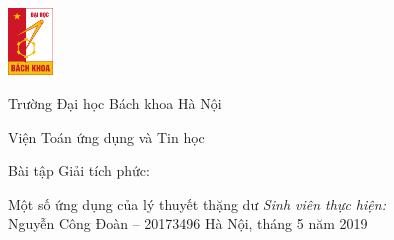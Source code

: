 \documentclass[14pt]{article}
\begin{document}
\begin{titlepage}
	\parbox{4.2em}{
		\includegraphics[width=3.2em]{resources/bk.jpg}
	}
	\parbox{\textwidth-4.6em}{
		{\LARGE Trường Đại học Bách khoa Hà Nội\par}
		{\Large Viện Toán ứng dụng và Tin học}
	}
	\vfill
	\begin{center}
		{\Large Bài tập Giải tích phức:}\par
		{\LARGE Một số ứng dụng của lý thuyết thặng dư}
		\vfill
		\textit{Sinh viên thực hiện:}\\
		Nguyễn Công Đoàn -- 20173496
		\vfill
		Hà Nội, tháng 5 năm 2019
	\end{center}
\end{titlepage}
\end{document}
